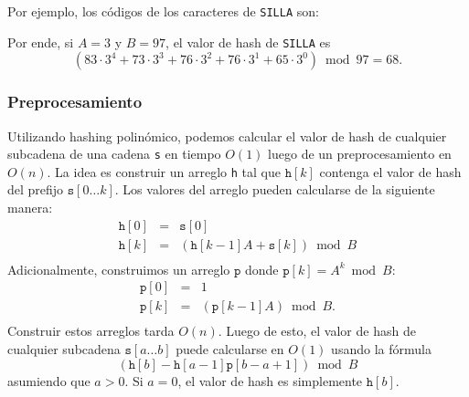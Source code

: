 Por ejemplo, los códigos de los caracteres de \texttt{SILLA} son:
\begin{center}
\end{center}

Por ende, si $A=3$ y $B=97$, el valor de hash de \texttt{SILLA} es
\[(83 \cdot 3^4 + 73 \cdot 3^3 + 76 \cdot 3^2 + 76 \cdot 3^1 + 65 \cdot 3^0) \bmod 97 = 68.\]

\subsubsection*{Preprocesamiento}

Utilizando hashing polinómico, podemos calcular el valor de hash de
cualquier subcadena de una cadena \texttt{s} en tiempo $O(1)$ luego de un
preprocesamiento en $O(n)$. La idea es construir un arreglo \texttt{h} tal
que $\texttt{h}[k]$ contenga el valor de hash del prefijo
$\texttt{s}[0 \ldots k]$. Los valores del arreglo pueden calcularse de la
siguiente manera:
\[
    \begin{array}{lcl}
        \texttt{h}[0] & = & \texttt{s}[0]                               \\
        \texttt{h}[k] & = & (\texttt{h}[k-1] A + \texttt{s}[k]) \bmod B \\
    \end{array}
\]
Adicionalmente, construimos un arreglo $\texttt{p}$ donde
$\texttt{p}[k]=A^k \bmod B$:
\[
    \begin{array}{lcl}
        \texttt{p}[0] & = & 1                            \\
        \texttt{p}[k] & = & (\texttt{p}[k-1] A) \bmod B. \\
    \end{array}
\]
Construir estos arreglos tarda $O(n)$. Luego de esto, el valor de hash
de cualquier subcadena $\texttt{s}[a \ldots b]$ puede calcularse en
$O(1)$ usando la fórmula
\[(\texttt{h}[b]-\texttt{h}[a-1] \texttt{p}[b-a+1]) \bmod B\]
asumiendo que $a>0$. Si $a=0$, el valor de hash es simplemente
$\texttt{h}[b]$.

